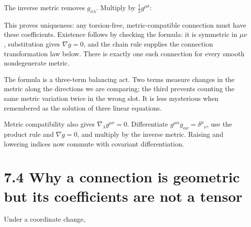 \documentclass[
  11pt,
  letterpaper,
  oneside,
  openany]{scrbook}
\begin{document}
The inverse metric removes \(g_{\sigma\lambda}\). Multiply by
\(\tfrac12g^{\rho\sigma}\):

\begin{center}
\begingroup
{}
\ifdim\wd\grmathbox>\linewidth
\resizebox{\linewidth}{!}{\usebox{\grmathbox}}
\else\usebox{\grmathbox}\fi
\endgroup
\end{center}

This proves uniqueness: any torsion-free, metric-compatible connection
must have these coefficients. Existence follows by checking the formula:
it is symmetric in \(\mu\nu\), substitution gives \(\nabla g=0\), and
the chain rule supplies the connection transformation law below. There
is exactly one such connection for every smooth nondegenerate metric.

The formula is a three-term balancing act. Two terms measure changes in
the metric along the directions we are comparing; the third prevents
counting the same metric variation twice in the wrong slot. It is less
mysterious when remembered as the solution of three linear equations.

Metric compatibility also gives \(\nabla_\lambda g^{\mu\nu}=0\).
Differentiate \(g^{\mu\alpha}g_{\alpha\nu}=\delta^\mu{}_{\nu}\), use the
product rule and \(\nabla g=0\), and multiply by the inverse metric.
Raising and lowering indices now commute with covariant differentiation.

\hypertarget{why-a-connection-is-geometric-but-its-coefficients-are-not-a-tensor}{%
\section{7.4 Why a connection is geometric but its coefficients are not
a
tensor}\label{why-a-connection-is-geometric-but-its-coefficients-are-not-a-tensor}}

Under a coordinate change,

\begin{center}
\begingroup
{}
\ifdim\wd\grmathbox>\linewidth
\resizebox{\linewidth}{!}{\usebox{\grmathbox}}
\else\usebox{\grmathbox}\fi
\endgroup
\end{center}
\end{document}
